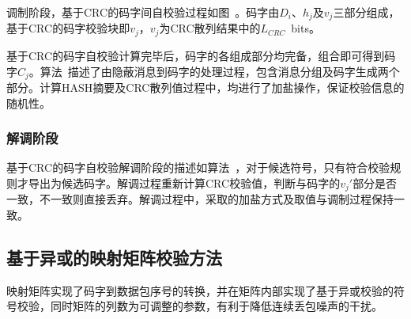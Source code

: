 调制阶段，基于CRC的码字间自校验过程如图\ 。码字由$D_{i}$、$h_{j}$及$v_{j}$三部分组成，基于CRC的码字校验块即$v_{j}$，$v_{j}$为CRC散列结果中的{$L_{CRC}$\ bits}。

基于CRC的码字自校验计算完毕后，码字的各组成部分均完备，组合即可得到码字$C_{j}$。算法\ 描述了由隐蔽消息到码字的处理过程，包含消息分组及码字生成两个部分。计算HASH摘要及CRC散列值过程中，均进行了加盐操作，保证校验信息的随机性。

\subsubsection{解调阶段}
\label{chap:hash:robustness:crc:demodulation}


基于CRC的码字自校验解调阶段的描述如算法\ ，对于候选符号，只有符合校验规则才导出为候选码字。解调过程重新计算CRC校验值，判断与码字的$v_{j}'$部分是否一致，不一致则直接丢弃。解调过程中，采取的加盐方式及取值与调制过程保持一致。

\subsection{基于异或的映射矩阵校验方法}
\label{chap:hash:robustness:xor}

映射矩阵实现了码字到数据包序号的转换，并在矩阵内部实现了基于异或校验的符号校验，同时矩阵的列数为可调整的参数，有利于降低连续丢包噪声的干扰。

